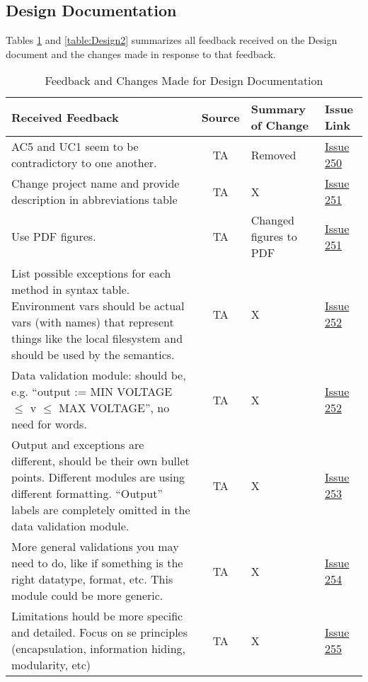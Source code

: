\documentclass{article}
\begin{document}
\subsection{Design Documentation}
Tables \ref{table:Design1} and \ref{table:Design2} summarizes all feedback received on the Design document
and the changes made in response to that feedback.
\begin{table}[H]
\centering
\begin{tabularx}{\textwidth}{|X|c|X|p{1.5cm}|}
    \hline
    \textbf{Received Feedback} & \textbf{Source} & \textbf{Summary of Change}
    & \textbf{Issue Link} \\
    \hline
    AC5 and UC1 seem to be contradictory to one another. & TA & Removed &
    \href{https://github.com/SumanyaG/Alkalytics/issues/250}{Issue 250} \\
    \hline
    Change project name and provide description in abbreviations table & TA & X
    & \href{https://github.com/SumanyaG/Alkalytics/issues/251}{Issue 251} \\
    \hline
    Use PDF figures. & TA & Changed figures to PDF &
    \href{https://github.com/SumanyaG/Alkalytics/issues/251}{Issue 251} \\
    \hline
    List possible exceptions for each method in syntax table. Environment vars
    should be actual vars (with names) that represent things like the local
    filesystem and should be used by the semantics. & TA & X &
    \href{https://github.com/SumanyaG/Alkalytics/issues/252}{Issue 252} \\
    \hline
    Data validation module: should be, e.g. ``output := MIN VOLTAGE $\le$ v
    $\le$ MAX VOLTAGE'', no need for words. & TA & X &
    \href{https://github.com/SumanyaG/Alkalytics/issues/252}{Issue 252} \\
    \hline
    Output and exceptions are different, should be their own bullet points.
    Different modules are using different formatting. ``Output'' labels are
    completely omitted in the data validation module. & TA & X &
    \href{https://github.com/SumanyaG/Alkalytics/issues/253}{Issue 253} \\
    \hline
    More general validations you may need to do, like if something is the
    right datatype, format, etc. This module could be more generic. & TA & X &
    \href{https://github.com/SumanyaG/Alkalytics/issues/254}{Issue 254} \\
    \hline
    Limitations hould be more specific and detailed. Focus on se principles
    (encapsulation, information hiding, modularity, etc) & TA & X &
    \href{https://github.com/SumanyaG/Alkalytics/issues/255}{Issue 255} \\
    \hline
\end{tabularx}
\caption{Feedback and Changes Made for Design Documentation}
\label{table:Design1}
\end{table}
\end{document}
